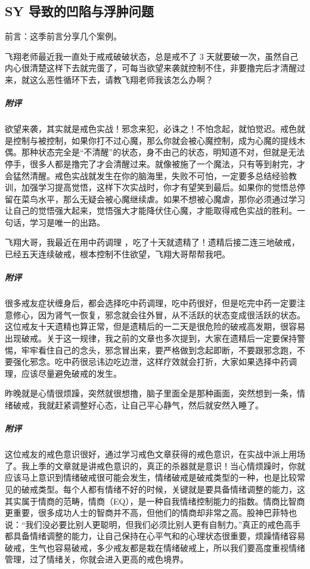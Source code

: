 \subsection{SY 导致的凹陷与浮肿问题}

前言：这季前言分享几个案例。

\begin{case}
    飞翔老师最近我一直处于戒戒破破状态，总是戒不了 3 天就要破一次，虽然自己内心很清楚这样下去就完蛋了，可每当欲望来袭就控制不住，非要撸完后才清醒过来，就这么恶性循环下去，请教飞翔老师我该怎么办啊？
    \subparagraph{附评} 欲望来袭，其实就是戒色实战！邪念来犯，必诛之！不怕念起，就怕觉迟。戒色就是控制与被控制，如果你打不过心魔，那么你就会被心魔控制，成为心魔的提线木偶。那种状态完全是“不清醒”的状态，身不由己的状态，明知道不对，但就是无法停手，很多人都是撸完了才会清醒过来。就像被施了一个魔法，只有等到射完，才会猛然清醒。戒色实战就发生在你的脑海里，失败不可怕，一定要多总结经验教训，加强学习提高觉悟，这样下次实战时，你才有望笑到最后。如果你的觉悟总停留在菜鸟水平，那么无疑会被心魔继续虐。如果不想被心魔虐，那你必须通过学习让自己的觉悟强大起来，觉悟强大才能降伏住心魔，才能取得戒色实战的胜利。一句话，学习是唯一的出路。
\end{case}

\begin{case}
    飞翔大哥，我最近在用中药调理 ，吃了十天就遗精了！遗精后接二连三地破戒，已经五天连续破戒，根本控制不住欲望，飞翔大哥帮帮我吧。
    \subparagraph{附评} 很多戒友症状缠身后，都会选择吃中药调理，吃中药很好，但是吃完中药一定要注意修心，因为肾气一恢复，邪念就会往外冒，从不活跃的状态变成很活跃的状态。这位戒友十天遗精也算正常，但是遗精后的一二天是很危险的破戒高发期，很容易出现破戒。关于这一规律，我之前的文章也多次提到，大家在遗精后一定要保持警惕，牢牢看住自己的念头，邪念冒出来，要严格做到念起即断，不要跟邪念跑，不要强化邪念。吃中药很忌讳边吃边泄，这样疗效就会打折，大家如果选择中药调理，应该尽量避免破戒的发生。
\end{case}

\begin{case}
    昨晚就是心情很烦躁，突然就很想撸，脑子里面全是那种画面，突然想到一条，情绪破戒，我就赶紧调整好心态，让自己平心静气，然后就安然入睡了。
    \subparagraph{附评} 这位戒友的戒色意识很好，通过学习戒色文章获得的戒色意识，在实战中派上用场了。我上季的文章就是讲戒色意识的，真正的杀器就是意识！当心情烦躁时，你就应该马上意识到情绪破戒很可能会发生，情绪破戒是破戒类型的一种，也是比较常见的破戒类型。每个人都有情绪不好的时候，关键就是要具备情绪调整的能力，这其实属于情商的范畴，情商（EQ），是一种自我情绪控制能力的指数。情商比智商更重要，很多成功人士的智商并不高，但他们的情商却非常之高。股神巴菲特也说：“我们没必要比别人更聪明，但我们必须比别人更有自制力。”真正的戒色高手都具备情绪调整的能力，让自己保持在心平气和的心理状态很重要，烦躁情绪容易破戒，生气也容易破戒，多少戒友都是栽在情绪破戒上，所以我们要高度重视情绪管理，过了情绪关，你就会进入更高的戒色境界。
\end{case}

